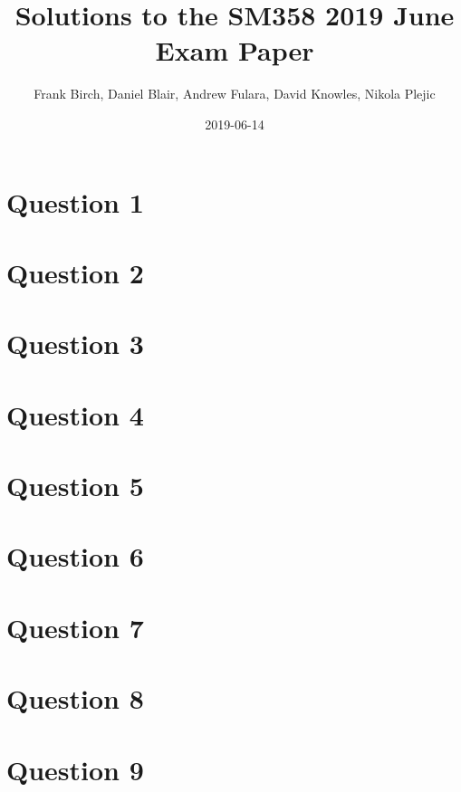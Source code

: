 \documentclass{article}
\title{Solutions to the SM358 2019 June Exam Paper}
\author{Frank Birch, Daniel Blair, Andrew Fulara, David Knowles, Nikola Plejic}
\date{2019-06-14}
\begin{document}
\begin{titlingpage}
    \maketitle
\end{titlingpage}

\fancyhf{}


\section{Question 1}


\section{Question 2}


\section{Question 3}


\section{Question 4}


\section{Question 5}


\section{Question 6}


\section{Question 7}


\section{Question 8}


\section{Question 9}

\end{document}
